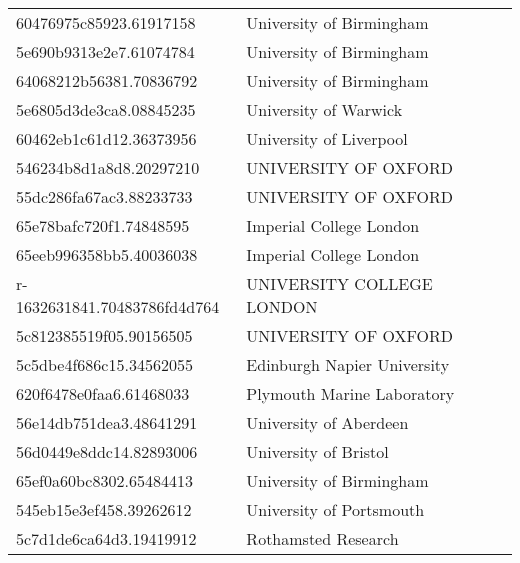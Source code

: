 \begin{tabular}{ll}
60476975c85923.61917158 & University of Birmingham \\
5e690b9313e2e7.61074784 & University of Birmingham \\
64068212b56381.70836792 & University of Birmingham \\
5e6805d3de3ca8.08845235 & University of Warwick \\
60462eb1c61d12.36373956 & University of Liverpool \\
546234b8d1a8d8.20297210 & UNIVERSITY OF OXFORD \\
55dc286fa67ac3.88233733 & UNIVERSITY OF OXFORD \\
65e78bafc720f1.74848595 & Imperial College London \\
65eeb996358bb5.40036038 & Imperial College London \\
r-1632631841.70483786fd4d764 & UNIVERSITY COLLEGE LONDON \\
5c812385519f05.90156505 & UNIVERSITY OF OXFORD \\
5c5dbe4f686c15.34562055 & Edinburgh Napier University \\
620f6478e0faa6.61468033 & Plymouth Marine Laboratory \\
56e14db751dea3.48641291 & University of Aberdeen \\
56d0449e8ddc14.82893006 & University of Bristol \\
65ef0a60bc8302.65484413 & University of Birmingham \\
545eb15e3ef458.39262612 & University of Portsmouth \\
5c7d1de6ca64d3.19419912 & Rothamsted Research \\
\bottomrule
\end{tabular}
